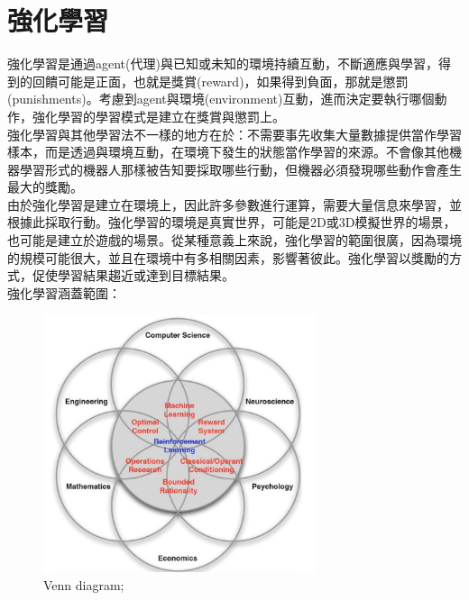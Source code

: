 \documentclass[14pt,a4paper]{report}  %
\begin{document}
\newpage
\section{強化學習}
強化學習是通過agent(代理)與已知或未知的環境持續互動，不斷適應與學習，得到的回饋可能是正面，也就是獎賞(reward)，如果得到負面，那就是懲罰(punishments)。考慮到agent與環境(environment)互動，進而決定要執行哪個動作，強化學習的學習模式是建立在獎賞與懲罰上。\\[6pt]
強化學習與其他學習法不一樣的地方在於：不需要事先收集大量數據提供當作學習樣本，而是透過與環境互動，在環境下發生的狀態當作學習的來源。不會像其他機器學習形式的機器人那樣被告知要採取哪些行動，但機器必須發現哪些動作會產生最大的獎勵。\\[6pt]
由於強化學習是建立在環境上，因此許多參數進行運算，需要大量信息來學習，並根據此採取行動。強化學習的環境是真實世界，可能是2D或3D模擬世界的場景，也可能是建立於遊戲的場景。從某種意義上來說，強化學習的範圍很廣，因為環境的規模可能很大，並且在環境中有多相關因素，影響著彼此。強化學習以獎勵的方式，促使學習結果趨近或達到目標結果。\\[12pt]
強化學習涵蓋範圍：\\

\begin{figure}[hbt!]
\begin{center}
\includegraphics[width=8cm]{Faces_of_Reinforcement_Learning}
\caption{Venn diagram; }%
\end{center}
\end{figure}
\end{document}
